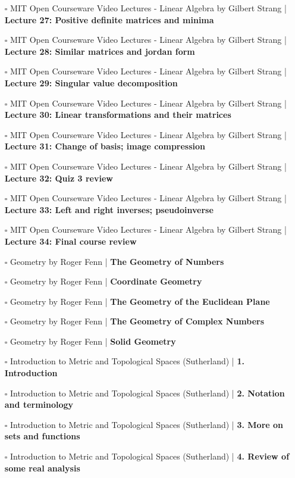 \documentclass[a4, landscape, 12pt]{article}
\newcommand{\checkbox}{$\square$}%
\begin{document}
\begin{itemize}
{}
\item [\checkbox] MIT Open Courseware Video Lectures - Linear Algebra by Gilbert Strang  | \textbf{Lecture 27: Positive definite matrices and minima
}
\item [\checkbox] MIT Open Courseware Video Lectures - Linear Algebra by Gilbert Strang  | \textbf{Lecture 28: Similar matrices and jordan form
}
\item [\checkbox] MIT Open Courseware Video Lectures - Linear Algebra by Gilbert Strang  | \textbf{Lecture 29: Singular value decomposition
}
\item [\checkbox] MIT Open Courseware Video Lectures - Linear Algebra by Gilbert Strang  | \textbf{Lecture 30: Linear transformations and their matrices
}
\item [\checkbox] MIT Open Courseware Video Lectures - Linear Algebra by Gilbert Strang  | \textbf{Lecture 31: Change of basis; image compression
}
\item [\checkbox] MIT Open Courseware Video Lectures - Linear Algebra by Gilbert Strang  | \textbf{Lecture 32: Quiz 3 review
}
\item [\checkbox] MIT Open Courseware Video Lectures - Linear Algebra by Gilbert Strang  | \textbf{Lecture 33: Left and right inverses; pseudoinverse
}
\item [\checkbox] MIT Open Courseware Video Lectures - Linear Algebra by Gilbert Strang  | \textbf{Lecture 34: Final course review
}
\item [\checkbox] Geometry by Roger Fenn  | \textbf{The Geometry of Numbers
}
\item [\checkbox] Geometry by Roger Fenn  | \textbf{Coordinate Geometry
}
\item [\checkbox] Geometry by Roger Fenn  | \textbf{The Geometry of the Euclidean Plane
}
\item [\checkbox] Geometry by Roger Fenn  | \textbf{The Geometry of Complex Numbers
}
\item [\checkbox] Geometry by Roger Fenn  | \textbf{Solid Geometry
}
\item [\checkbox] Introduction to Metric and Topological Spaces (Sutherland)  | \textbf{1. Introduction
}
\item [\checkbox] Introduction to Metric and Topological Spaces (Sutherland)  | \textbf{2. Notation and terminology
}
\item [\checkbox] Introduction to Metric and Topological Spaces (Sutherland)  | \textbf{3. More on sets and functions
}
\item [\checkbox] Introduction to Metric and Topological Spaces (Sutherland)  | \textbf{4. Review of some real analysis
}
\end{itemize}
\end{document}
